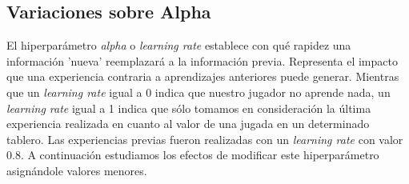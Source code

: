 \documentclass[10pt,a4paper]{article}
\begin{document}
\subsection{Variaciones sobre Alpha}
El hiperparámetro \textit{alpha} o \textit{learning rate} establece con qué rapidez una información 'nueva' reemplazará a la información previa. Representa el impacto que una experiencia contraria a aprendizajes anteriores puede generar. Mientras que un \textit{learning rate} igual a 0 indica que nuestro jugador no aprende nada, un \textit{learning rate} igual a 1 indica que sólo tomamos en consideración la última experiencia realizada en cuanto al valor de una jugada en un determinado tablero. Las experiencias previas fueron realizadas con un \textit{learning rate} con valor 0.8. A continuación estudiamos los efectos de modificar este hiperparámetro asignándole valores menores.
\end{document}
